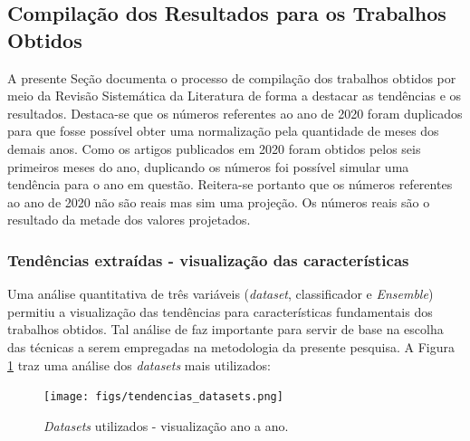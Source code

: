\subsection{Compilação dos Resultados para os Trabalhos Obtidos}
\label{compilacao-rsl}

A presente Seção documenta o processo de compilação dos trabalhos obtidos por meio da Revisão Sistemática da Literatura de forma a destacar as tendências e os resultados. Destaca-se que os números referentes ao ano de 2020 foram duplicados para que fosse possível obter uma normalização pela quantidade de meses dos demais anos. Como os artigos publicados em 2020 foram obtidos pelos seis primeiros meses do ano, duplicando os números foi possível simular uma tendência para o ano em questão. Reitera-se portanto que os números referentes ao ano de 2020 não são reais mas sim uma projeção. Os números reais são o resultado da metade dos valores projetados.  

\subsubsection{Tendências extraídas - visualização das características}
\label{sub-tendencias}


Uma análise quantitativa de três variáveis (\textit{dataset}, classificador e \textit{Ensemble}) permitiu a visualização das tendências para características fundamentais dos trabalhos obtidos. Tal análise de faz importante para servir de base na escolha das técnicas a serem empregadas na metodologia da presente pesquisa. A Figura \ref{fig:tend_dataset} traz uma análise dos \textit{datasets} mais utilizados:

\begin{figure}[H]
\centering
\caption{\textit{Datasets} utilizados - visualização ano a ano.}
\texttt{[image: figs/tendencias\_datasets.png]}
\newline {}\label{fig:tend_dataset}
\end{figure}

